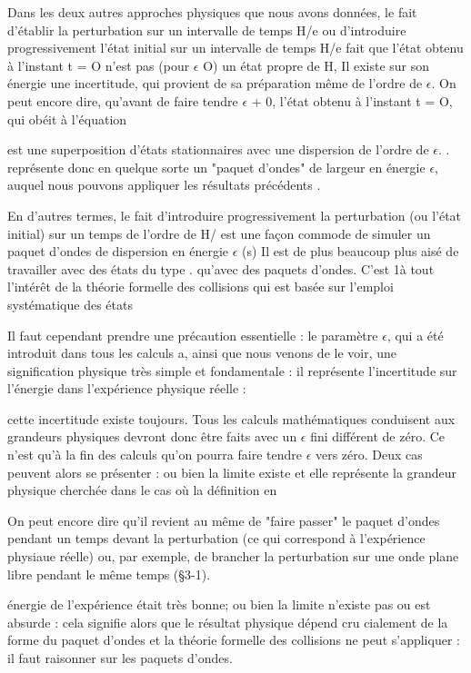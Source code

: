 Dans les deux autres approches physiques que nous avons données,
le fait d'établir la perturbation sur un intervalle de temps H/e ou d'introduire
progressivement l'état initial sur un intervalle de temps H/e
fait que l'état obtenu à l'instant t = O n'est pas (pour $\epsilon$  O) un état
propre de H, Il existe sur son énergie une incertitude, qui provient de sa
préparation même de l'ordre de $\epsilon$. On peut encore dire, qu'avant de faire
tendre $\epsilon$ + 0, l'état obtenu à l'instant t = O,  qui obéit à l'équation 


est une superposition d'états stationnaires  avec une dispersion
de l'ordre de $\epsilon$. . représente donc en quelque sorte un "paquet
d'ondes" de largeur en énergie $\epsilon$, auquel nous pouvons appliquer les résultats précédents .

En d'autres termes, le fait d'introduire progressivement la
perturbation (ou l'état initial) sur un temps de l'ordre de H/ est une
façon commode de simuler un paquet d'ondes de dispersion en énergie $\epsilon$ (s)
Il est de plus beaucoup plus aisé de travailler avec des états du type
. qu'avec des paquets d'ondes. C'est 1à tout l'intérêt de la
théorie formelle des collisions qui est basée sur l'emploi systématique
des états 

Il faut cependant prendre une précaution essentielle : le
paramètre $\epsilon$, qui a été introduit dans tous les calculs a, ainsi que nous
venons de le voir, une signification physique très simple et fondamentale :
il représente l'incertitude sur l'énergie dans l'expérience physique réelle :

cette incertitude existe toujours. Tous les calculs mathématiques conduisent
aux grandeurs physiques devront donc être faits avec un $\epsilon$ fini différent de
zéro. Ce n'est qu'à la fin des calculs qu'on pourra faire tendre $\epsilon$ vers zéro.
Deux cas peuvent alors se présenter : ou bien la limite existe et elle
représente la grandeur physique cherchée dans le cas où la définition en

 On peut encore dire qu'il revient au même de "faire passer" le paquet
d'ondes pendant un temps  devant la perturbation (ce qui correspond
à l'expérience physiaue réelle) ou, par exemple, de brancher la perturbation sur
une onde plane libre pendant le même temps (\S 3-1).

 

énergie de l'expérience était très bonne; ou bien la limite n'existe pas
ou est absurde : cela signifie alors que le résultat physique dépend cru
cialement de la forme du paquet d'ondes et la théorie formelle des collisions
ne peut s'appliquer : il faut raisonner sur les paquets d'ondes.

